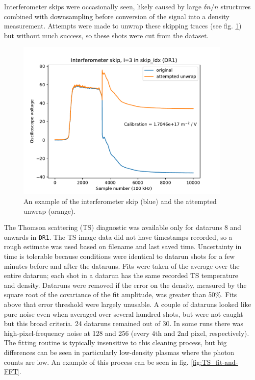 Interferometer skips were occasionally seen, likely caused by large $\delta n / n$ structures combined with downsampling before conversion of the signal into a density measurement. Attempts were made to unwrap these skipping traces (see fig. \ref{fig:ifo-skip}) but without much success, so these shots were cut from the dataset.

\begin{figure}
	\centering
	\includegraphics[width=300pt]{figures/ifo_skip_example.pdf}
	\caption[Example interferometer skips]{\label{fig:ifo-skip} An example of the interferometer skip (blue) and the attempted unwrap (orange).}
\end{figure}

The Thomson scattering (TS) diagnostic was available only for dataruns 8 and onwards in \texttt{DR1}. The TS image data did not have timestamps recorded, so a rough estimate was used based on filename and last saved time. Uncertainty in time is tolerable because conditions were identical to datarun shots for a few minutes before and after the dataruns. Fits were taken of the average over the entire datarun; each shot in a datarun has the same recorded TS temperature and density. 
Dataruns were removed if the error on the density, measured by the square root of the covariance of the fit amplitude, was greater than 50\%. Fits above that error threshold were largely unusable. A couple of dataruns looked like pure noise even when averaged over several hundred shots, but were not caught but this broad criteria. 24 dataruns remained out of 30.
In some runs there was high-pixel-frequency noise at 128 and 256 (every 4th and 2nd pixel, respectively). The fitting routine is typically insensitive to this cleaning process, but big differences can be seen in particularly low-density plasmas where the photon counts are low. An example of this process can be seen in fig. \ref{fig:TS_fit-and-FFT}.

